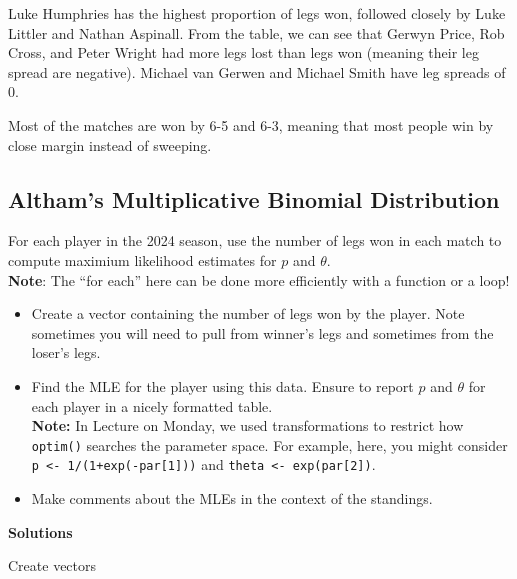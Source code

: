 \documentclass[
]{article}
\providecommand{\tightlist}{%
  \setlength{\itemsep}{0pt}\setlength{\parskip}{0pt}}
\begin{document}
\normalsize

Luke Humphries has the highest proportion of legs won, followed closely
by Luke Littler and Nathan Aspinall. From the table, we can see that
Gerwyn Price, Rob Cross, and Peter Wright had more legs lost than legs
won (meaning their leg spread are negative). Michael van Gerwen and
Michael Smith have leg spreads of 0.

Most of the matches are won by 6-5 and 6-3, meaning that most people win
by close margin instead of sweeping.

\subsection{Altham's Multiplicative Binomial
Distribution}\label{althams-multiplicative-binomial-distribution-1}

For each player in the 2024 season, use the number of legs won in each
match to compute maximium likelihood estimates for \(p\) and
\(\theta\).\\
\textbf{Note}: The ``for each'' here can be done more efficiently with a
function or a loop!

\begin{itemize}
\tightlist
\item
  Create a vector containing the number of legs won by the player. Note
  sometimes you will need to pull from winner's legs and sometimes from
  the loser's legs.
\item
  Find the MLE for the player using this data. Ensure to report \(p\)
  and \(\theta\) for each player in a nicely formatted table.\\
  \textbf{Note:} In Lecture on Monday, we used transformations to
  restrict how \texttt{optim()} searches the parameter space. For
  example, here, you might consider
  \texttt{p\ \textless{}-\ 1/(1+exp(-par{[}1{]}))} and
  \texttt{theta\ \textless{}-\ exp(par{[}2{]})}.
\item
  Make comments about the MLEs in the context of the standings.
\end{itemize}

\textbf{Solutions}

Create vectors

\normalsize
\end{document}

